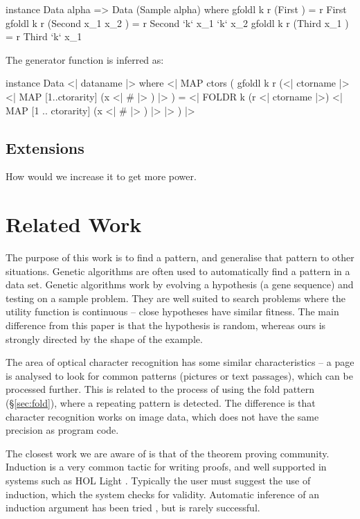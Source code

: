 \documentclass[preprint]{sigplanconf}
\begin{document}
\begin{code}
instance Data alpha => Data (Sample alpha) where
    gfoldl k r (First            ) = r First
    gfoldl k r (Second  x_1 x_2  ) = r Second  `k` x_1 `k` x_2
    gfoldl k r (Third   x_1      ) = r Third   `k` x_1
\end{code}

\noindent The generator function is inferred as:

\ignore\begin{code}
instance Data \? <| dataname |> where
    <| MAP ctors (
        gfoldl k r
            (<| ctorname |> \? <| MAP [1..ctorarity] (x <| # |> ) |> ) =
            <| FOLDR k (r \? <| ctorname |>)
                <| MAP [1 .. ctorarity] (x <| # |> ) |>
            |>
    ) |>
\end{code}

\subsection{Extensions}

How would we increase it to get more power.

\section{Related Work}
\label{sec:related}

The purpose of this work is to find a pattern, and generalise that pattern to other situations. Genetic algorithms \cite{genetic_algorithms} are often used to automatically find a pattern in a data set. Genetic algorithms work by evolving a hypothesis (a gene sequence) and testing on a sample problem. They are well suited to search problems where the utility function is continuous -- close hypotheses have similar fitness. The main difference from this paper is that the hypothesis is random, whereas ours is strongly directed by the shape of the example.

The area of optical character recognition \cite{ocr} has some similar characteristics -- a page is analysed to look for common patterns (pictures or text passages), which can be processed further. This is related to the process of using the fold pattern (\S\ref{sec:fold}), where a repeating pattern is detected. The difference is that character recognition works on image data, which does not have the same precision as program code.

The closest work we are aware of is that of the theorem proving community. Induction is a very common tactic for writing proofs, and well supported in systems such as HOL Light \cite{hol_light}. Typically the user must suggest the use of induction, which the system checks for validity. Automatic inference of an induction argument has been tried \cite{mintchev:reasoning}, but is rarely successful.
\end{document}
